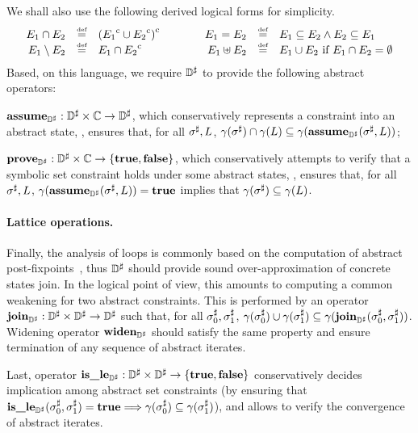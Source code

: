 We shall also use the following derived logical forms for simplicity.
\[
\begin{array}{rclcrcl}
  E_1 \cap E_2 & \stackrel{\textrm{\tiny def}}{=} & {({E_1}^{\mathrm{c}} \cup {E_2}^{\mathrm{c}})}^{\mathrm{c}}
  & \qquad &
  E_1 = E_2 & \stackrel{\textrm{\tiny def}}{=} & E_1 \subseteq E_2 \wedge E_2 \subseteq E_1
  \\
  E_1 \setminus E_2 &  \stackrel{\textrm{\tiny def}}{=} & E_1 \cap {E_2}^{\mathrm{c}}
  & \qquad &
  E_1 \uplus E_2 & \stackrel{\textrm{\tiny def}}{=} & E_1 \cup E_2 \textrm{ if } E_1 \cap E_2 = \emptyset
  \\
\end{array}
\]
Based, on this language, we require \( {\mathbb{D}}^{\sharp} \) to provide the following
abstract operators:
\begin{compactitem}
\item \( \textbf{assume}_{{\mathbb{D}}^{\sharp}}: {\mathbb{D}}^{\sharp} \times \mathbb{C} \rightarrow {\mathbb{D}}^{\sharp} \), which
  conservatively represents a constraint into an abstract state, \ie,
  ensures that, for all \( {\sigma}^{\sharp}, L \), \( \gamma( {\sigma}^{\sharp} ) \cap
  \gamma( L ) \subseteq \gamma( \textbf{assume}_{{\mathbb{D}}^{\sharp}}( {\sigma}^{\sharp}, L ) ) \);
\item \( \textbf{prove}_{{\mathbb{D}}^{\sharp}}: {\mathbb{D}}^{\sharp} \times \mathbb{C} \rightarrow \{ \mathbf{true}, \mathbf{false} \} \),
  which conservatively attempts to verify that a symbolic set constraint
  holds under some abstract states, \ie, ensures that, for all \( {\sigma}^{\sharp},
  L \), \( \gamma( \textbf{assume}_{{\mathbb{D}}^{\sharp}}( {\sigma}^{\sharp}, L ) ) = \mathbf{true} \) implies that
  \( \gamma( {\sigma}^{\sharp} ) \subseteq \gamma( L ) \).
\end{compactitem}

\paragraph{Lattice operations.}
Finally, the analysis of loops is commonly based on the computation of
abstract post-fixpoints~\cite{cc:popl:77}, thus \( {\mathbb{D}}^{\sharp} \) should provide
sound over-approximation of concrete states join.
In the logical point of view, this amounts to computing a common weakening
for two abstract constraints.
This is performed by an operator \( \textbf{join}_{{\mathbb{D}}^{\sharp}}: {\mathbb{D}}^{\sharp} \times {\mathbb{D}}^{\sharp}
\rightarrow {\mathbb{D}}^{\sharp} \) such that, for all \( {\sigma}^{\sharp}_0, {\sigma}^{\sharp}_1 \),
\( \gamma( {\sigma}^{\sharp}_0 ) \cup \gamma( {\sigma}^{\sharp}_1 ) \subseteq
\gamma( \textbf{join}_{{\mathbb{D}}^{\sharp}}( {\sigma}^{\sharp}_0, {\sigma}^{\sharp}_1 ) ) \).
Widening operator \( \textbf{widen}_{{\mathbb{D}}^{\sharp}} \) should satisfy the same property
and ensure termination of any sequence of abstract iterates.

Last, operator \( \textbf{is\_le}_{{\mathbb{D}}^{\sharp}}: {\mathbb{D}}^{\sharp} \times {\mathbb{D}}^{\sharp} \rightarrow \{ \mathbf{true},
\mathbf{false} \} \) conservatively decides implication among abstract set
constraints (by ensuring that \( \textbf{is\_le}_{{\mathbb{D}}^{\sharp}}( {\sigma}^{\sharp}_0, {\sigma}^{\sharp}_1 ) =
\mathbf{true} \Longrightarrow \gamma( {\sigma}^{\sharp}_0 ) \subseteq \gamma(
{\sigma}^{\sharp}_1 ) \)), and allows to verify the convergence of abstract
iterates.

